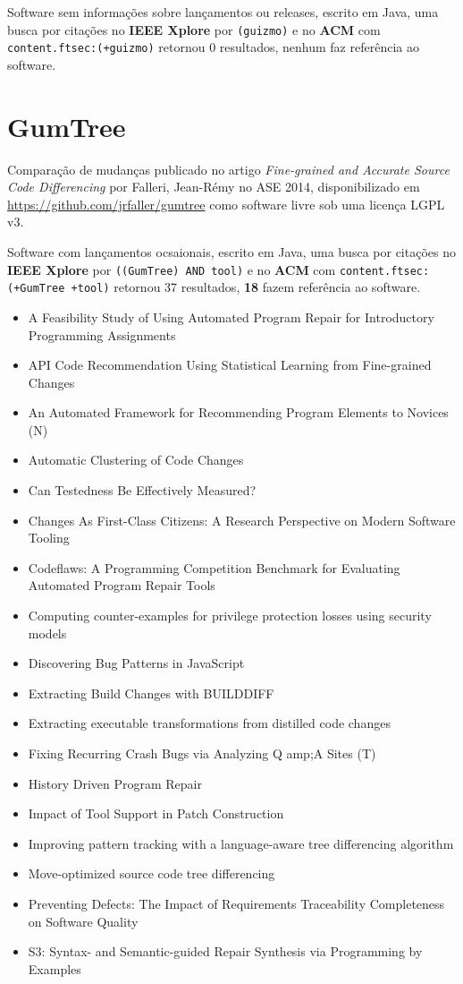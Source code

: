 Software sem informações sobre lançamentos ou releases,
escrito em Java,
uma busca por citações no {\bf IEEE Xplore} por
\texttt{(guizmo)}
e no {\bf ACM} com
\texttt{content.ftsec:(+guizmo)}
retornou
0 resultados,
nenhum faz referência ao software.



\section{GumTree}

Comparação de mudanças
publicado no artigo {\it Fine-grained and Accurate Source Code Differencing}
por Falleri, Jean-R{\'e}my
no ASE 2014,
disponibilizado em \url{https://github.com/jrfaller/gumtree}
como software livre
sob uma licença LGPL v3.

Software com lançamentos ocsaionais,
escrito em Java,
uma busca por citações no {\bf IEEE Xplore} por
\texttt{((GumTree) AND tool)}
e no {\bf ACM} com
\texttt{content.ftsec:(+GumTree +tool)}
retornou
37 resultados,
{\bf 18} fazem referência ao software.

\begin{itemize}
\item A Feasibility Study of Using Automated Program Repair for Introductory Programming Assignments
\item API Code Recommendation Using Statistical Learning from Fine-grained Changes
\item An Automated Framework for Recommending Program Elements to Novices (N)
\item Automatic Clustering of Code Changes
\item Can Testedness Be Effectively Measured?
\item Changes As First-Class Citizens: A Research Perspective on Modern Software Tooling
\item Codeflaws: A Programming Competition Benchmark for Evaluating Automated Program Repair Tools
\item Computing counter-examples for privilege protection losses using security models
\item Discovering Bug Patterns in JavaScript
\item Extracting Build Changes with BUILDDIFF
\item Extracting executable transformations from distilled code changes
\item Fixing Recurring Crash Bugs via Analyzing Q amp;A Sites (T)
\item History Driven Program Repair
\item Impact of Tool Support in Patch Construction
\item Improving pattern tracking with a language-aware tree differencing algorithm
\item Move-optimized source code tree differencing
\item Preventing Defects: The Impact of Requirements Traceability Completeness on Software Quality
\item S3: Syntax- and Semantic-guided Repair Synthesis via Programming by Examples
\end{itemize}


